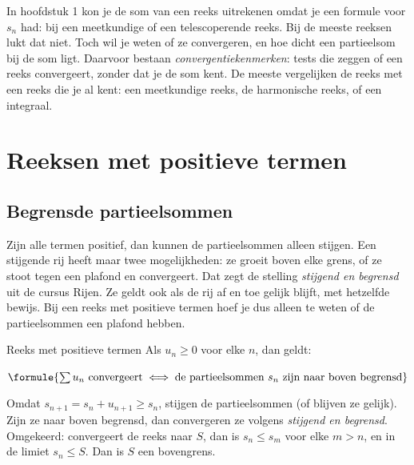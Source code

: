 In hoofdstuk 1 kon je de som van een reeks uitrekenen omdat je een formule voor $s_n$ had: bij een meetkundige of een telescoperende reeks. Bij de meeste reeksen lukt dat niet. Toch wil je weten of ze convergeren, en hoe dicht een partieelsom bij de som ligt. Daarvoor bestaan \textit{convergentiekenmerken}: tests die zeggen of een reeks convergeert, zonder dat je de som kent. De meeste vergelijken de reeks met een reeks die je al kent: een meetkundige reeks, de harmonische reeks, of een integraal.

\begin{oefeningen}[Start]

\end{oefeningen}


\section{Reeksen met positieve termen}

\subsection{Begrensde partieelsommen}

Zijn alle termen positief, dan kunnen de partieelsommen alleen stijgen. Een stijgende rij heeft maar twee mogelijkheden: ze groeit boven elke grens, of ze stoot tegen een plafond en convergeert. Dat zegt de stelling \textit{stijgend en begrensd} uit de cursus Rijen. Ze geldt ook als de rij af en toe gelijk blijft, met hetzelfde bewijs. Bij een reeks met positieve termen hoef je dus alleen te weten of de partieelsommen een plafond hebben.

\begin{theorie}
\begin{stelling}{Reeks met positieve termen}
Als $u_n \geqslant 0$ voor elke $n$, dan geldt:

\vspace{1mm}
\qquad $\formule{\sum u_n \text{ convergeert} \iff \text{de partieelsommen } s_n \text{ zijn naar boven begrensd}}$
\end{stelling}

\begin{bewijs}
Omdat $s_{n+1} = s_n + u_{n+1} \geqslant s_n$, stijgen de partieelsommen (of blijven ze gelijk). Zijn ze naar boven begrensd, dan convergeren ze volgens \textit{stijgend en begrensd}. Omgekeerd: convergeert de reeks naar $S$, dan is $s_n \leqslant s_m$ voor elke $m > n$, en in de limiet $s_n \leqslant S$. Dan is $S$ een bovengrens.
\end{bewijs}
\end{theorie}

